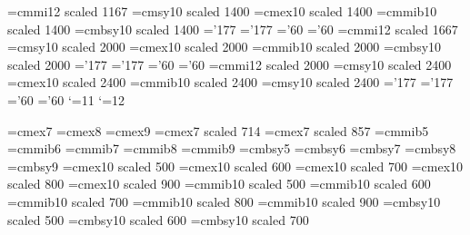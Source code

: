\font\fourteeni=cmmi12 scaled 1167
\font\fourteensy=cmsy10 scaled 1400
\font\fourteenex=cmex10 scaled 1400
\font\fourteenmib=cmmib10 scaled 1400
\font\fourteenbsy=cmbsy10 scaled 1400
\skewchar\fourteeni='177
\skewchar\fourteenmib='177
\skewchar\fourteensy='60
\skewchar\fourteenbsy='60
\font\twentyi=cmmi12 scaled 1667
\font\twentysy=cmsy10 scaled 2000
\font\twentyex=cmex10 scaled 2000
\font\twentymib=cmmib10 scaled 2000
\font\twentybsy=cmbsy10 scaled 2000
\skewchar\twentyi='177
\skewchar\twentymib='177
\skewchar\twentysy='60
\skewchar\twentybsy='60
\font\twentyfouri=cmmi12 scaled 2000
\font\twentyfoursy=cmsy10 scaled 2400
\font\twentyfourex=cmex10 scaled 2400
\font\twentyfourmib=cmmib10 scaled 2400
\font\twentyfourbsy=cmsy10 scaled 2400
\skewchar\twentyfouri='177
\skewchar\twentyfourmib='177
\skewchar\twentyfoursy='60
\skewchar\twentyfourbsy='60
\newdimen\bigsize
\newdimen\Bigsize
\newdimen\biggsize
\newdimen\Biggsize
\catcode`\@=11
\def\big#1{{\hbox{$\left#1\vbox to \bigsize{}\right.\n@space$}}}
\def\Big#1{{\hbox{$\left#1\vbox to \Bigsize{}\right.\n@space$}}}
\def\bigg#1{{\hbox{$\left#1\vbox to \biggsize{}\right.\n@space$}}}
\def\Bigg#1{{\hbox{$\left#1\vbox to \Biggsize{}\right.\n@space$}}}
\ifx\AMSfont\@undefined%
{}
\else
\let\ifAMS=\relax
\fi
\ifx\DStroke\@undefined%
{}
\else
\let\ifDS=\relax
\fi
\ifx\LMTone\@undefined%
{}
\else
\let\ifLMT=\relax
\fi
\ifx\LMTSone\@undefined%
{}
\else
\let\ifLMTS=\relax
\fi
\catcode`\@=12
\ifx\ifAMS\relax%
\immediate{}
\font\sevenex=cmex7
\font\eightex=cmex8
\font\nineex=cmex9
\font\fiveex=cmex7 scaled 714
\font\sixex=cmex7 scaled 857
\font\fivemib=cmmib5
\font\sixmib=cmmib6
\font\sevenmib=cmmib7
\font\eightmib=cmmib8
\font\ninemib=cmmib9
\font\fivebsy=cmbsy5
\font\sixbsy=cmbsy6
\font\sevenbsy=cmbsy7
\font\eightbsy=cmbsy8
\font\ninebsy=cmbsy9
\else
\font\fiveex=cmex10 scaled 500
\font\sixex=cmex10 scaled 600
\font\sevenex=cmex10 scaled 700
\font\eightex=cmex10 scaled 800
\font\nineex=cmex10 scaled 900
\font\fivemib=cmmib10 scaled 500
\font\sixmib=cmmib10 scaled 600
\font\sevenmib=cmmib10 scaled 700
\font\eightmib=cmmib10 scaled 800
\font\ninemib=cmmib10 scaled 900
\font\fivebsy=cmbsy10 scaled 500
\font\sixbsy=cmbsy10 scaled 600
\font\sevenbsy=cmbsy10 scaled 700
